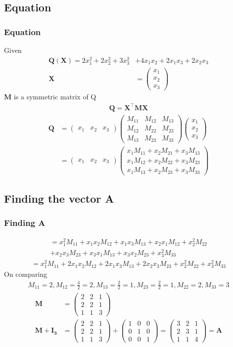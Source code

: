 \documentclass{beamer}
\providecommand{\brak}[1]{\ensuremath{\left(#1\right)}}
\theoremstyle{remark}
\newcommand{\myvec}[1]{\ensuremath{\begin{pmatrix}#1\end{pmatrix}}}
\let\vec\mathbf
\numberwithin{equation}{section}
\begin{document}
\subsection{Equation}
\begin{frame}
\frametitle{Equation}
Given
 \begin{align}
 \vec{Q\brak{\vec{X}}} = 2x^2_1 + 2x^2_2 + 3x^2_3 &+ 4x_1x_2 + 2x_1x_3 + 2x_2x_3  \\
 \vec{X}&=\myvec{x_1\\x_2\\x_3}
 \end{align}
 $\vec{M}$ is a symmetric matrix of Q
\begin{align}
     \vec{Q}=\vec{X}^\top\vec{M}\vec{X} 
     \end{align}
     \begin{align}
          \vec{Q}  &=\myvec{x_1 & x_2 & x_3}\myvec{M_{11} & M_{12} & M_{13}\\M_{12} &M_{22} &M_{23}\\M_{13} &M_{23}&M_{33}}\myvec{x_1\\x_2\\x_3} \\
            &=\myvec{x_1&x_2&x_3}\myvec{ x_1 M_{11} + x_2 M_{21} + x_3 M_{13} \\ x_1 M_{12} + x_2 M_{22} + x_3 M_{23} \\x_1 M_{13} + x_2 M_{23} + x_3 M_{33}}
            \end{align}
\end{frame}
\subsection{Finding the vector A}
\begin{frame}
\frametitle{Finding $\vec{A}$}
   \begin{align}
            =x_1^2 M_{11} + x_1 x_2 M_{12} + x_1 x_3 M_{13} + x_2 x_1 M_{12} + x_2^2 M_{22} \\ \nonumber+ x_2 x_3 M_{23} + x_3 x_1 M_{13} + x_3 x_2 M_{23} + x_3^2 M_{33}
            \end{align}
            \begin{align}
           =x_1^2 M_{11} + 2x_1 x_2 M_{12} + 2x_1 x_3 M_{13}+2x_2 x_3 M_{23} + x_2^2 M_{22}+x_3^2 M_{33}
            \end{align}
On comparing
\begin{align}
    M_{11}=2,M_{12}=\frac{4}{2}=2,M_{13}=\frac{2}{2}=1,M_{23}=\frac{2}{2}=1,M_{22}=2,M_{33}=3 
\end{align}
\begin{align}
    \vec{M}&=\myvec{2&2&1\\2&2&1\\1&1&3}\\
\vec{M}+\vec{I_3}&=\myvec{2&2&1\\2&2&1\\1&1&3}+\myvec{1&0&0\\0&1&0\\0&0&1}=\myvec{3&2&1\\2&3&1\\1&1&4}=\vec{A}
\end{align}
 \end{frame}
\end{document}
